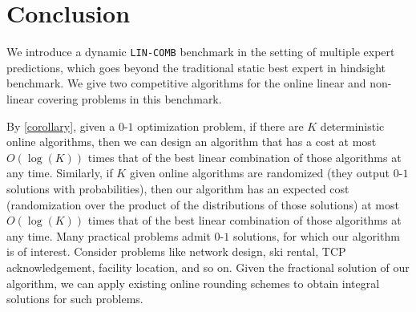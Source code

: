 
\section{Conclusion} \label{sec:conclusion}

We introduce a dynamic \texttt{LIN-COMB} benchmark in the setting of multiple expert predictions, which goes beyond the traditional static best expert in hindsight benchmark. We give two competitive algorithms for the online linear and non-linear covering problems in this benchmark.

By \cref{corollary}, given a $0$-$1$ optimization problem, if there are $K$ deterministic online algorithms, then
we can design an algorithm that has a cost at most $O(\log (K))$ times that of the best linear combination of those algorithms at any time.
Similarly, if $K$ given online algorithms are randomized (they output $0$-$1$ solutions with probabilities), then our algorithm
has an expected cost (randomization over the product of the distributions of those solutions) at most $O(\log(K))$ times that of
the best linear combination of those algorithms at any time. Many practical problems admit $0$-$1$ solutions, for which our algorithm is of interest.
Consider problems like network design, ski rental, TCP acknowledgement, facility location, and so on. Given the fractional solution of our algorithm,
we can apply existing online rounding schemes to obtain integral solutions for such problems.


%
